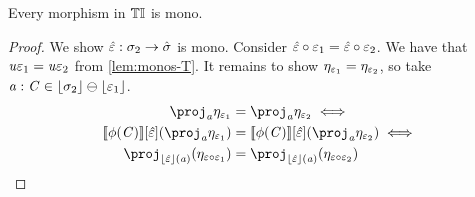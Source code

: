 \begin{lemma}\label{lem:monos-tinistC}
    Every morphism in ${\mathbb{T}\mathbb{I}}$ is mono.
\end{lemma}
\begin{proof}
    We show $\hat{\varepsilon} : \sigma_2 \to \hat\sigma$ is mono.
    Consider $\hat{\varepsilon} \circ \varepsilon_1 = \hat{\varepsilon} \circ \varepsilon_2$. 
    We have that $\mathit{u}\varepsilon_1 = \mathit{u}\varepsilon_2$ from \cref{lem:monos-T}.
    It remains to show $\eta_{\varepsilon_1} = \eta_{\varepsilon_2}$, so take $\mathit{a} : \mathit{C} \in \lfloor\sigma_2\rfloor \ominus \lfloor\varepsilon_1\rfloor$.
    \begin{align*}
        \proj_\va\mvarM_{\me_1} & = \proj_\va\mvarM_{\me_2} \iff \\
        \sem{\phi(\vC)}\anyL{\hat\me}(\proj_\va\mvarM_{\me_1}) & = \sem{\phi(\vC)}\anyL{\hat\me}(\proj_\va\mvarM_{\me_2}) \iff \\
        \proj_{\concL{\hat\me}(\va)}(\mvarM_{\me \comp \me_1}) & = \proj_{\concL{\hat\me}(\va)}(\mvarM_{\me \comp \me_2})
    \end{align*}
\end{proof}

